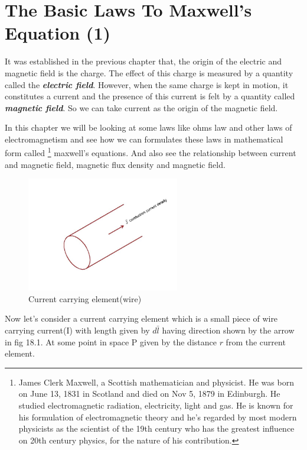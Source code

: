 \chapter{The Basic Laws To Maxwell's Equation (1)}
It was established in the previous chapter that, the origin of the electric and magnetic field is the charge. The effect of this charge is measured by a quantity called the \textbf{\emph{electric field}}. However, when the same charge is kept in motion, it constitutes a current and the presence of this current is felt by a quantity called \textbf{\emph{magnetic field}}. So we can take current as the origin of the magnetic field. 

In this chapter we will be looking at some laws like ohms law and other laws of electromagnetism and see how we can formulates these laws in mathematical form called \footnote[1]{James Clerk Maxwell, a Scottish mathematician and physicist. He was born on June 13, 1831 in Scotland and died on Nov 5, 1879 in Edinburgh. He studied electromagnetic radiation, electricity, light and gas. He is known for his formulation of electromagnetic theory and he's regarded by most modern physicists as the scientist of the 19th century who has the greatest influence on 20th century physics, for the nature of his contribution.} maxwell's equations. And also see the relationship between current and magnetic field, magnetic flux density and magnetic field.
\begin{figure}[h]
\centering
\includegraphics[height=5cm]{./graphics/f}
\caption{Current carrying element(wire)}
\label{}
\end{figure}

Now let's consider a current carrying element which is a small piece of wire carrying current(I) with length given by $d\bar{l}$ having direction shown by the arrow in fig 18.1. At some point in space P given by the  distance $r$ from the current element.

